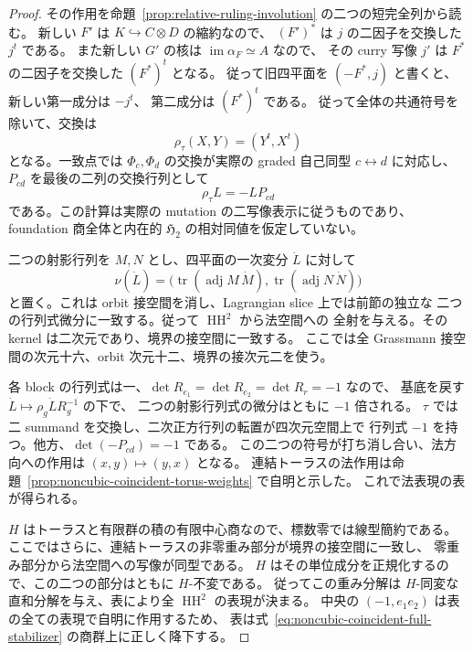 \begin{proof}
その作用を命題~\ref{prop:relative-ruling-involution} の二つの短完全列から読む。
新しい $F'$ は $K\hookrightarrow C\otimes D$ の縮約なので、
$(F')^*$ は $j$ の二因子を交換した $j^t$ である。
また新しい $G'$ の核は $\operatorname{im}\alpha_F\simeq A$ なので、
その curry 写像 $j'$ は $F^*$ の二因子を交換した $(F^*)^t$ となる。
従って旧四平面を $(-F^*,j)$ と書くと、新しい第一成分は $-j^t$、
第二成分は $(F^*)^t$ である。
従って全体の共通符号を除いて、交換は
\[
 \rho_\tau(X,Y)=(Y^t,X^t)
\]
となる。一致点では $\Phi_c,\Phi_d$ の交換が実際の graded 自己同型 $c\leftrightarrow d$
に対応し、$P_{cd}$ を最後の二列の交換行列として
\[
 \rho_\tau L=-LP_{cd}
\]
である。この計算は実際の mutation の二写像表示に従うものであり、
foundation 商全体と内在的 $\mathfrak H_2$ の相対同値を仮定していない。

二つの射影行列を $M,N$ とし、四平面の一次変分 $\dot L$ に対して
\[
 \nu(\dot L)=
 \bigl(\operatorname{tr}(\operatorname{adj}M\,\dot M),
       \operatorname{tr}(\operatorname{adj}N\,\dot N)\bigr)
\]
と置く。これは orbit 接空間を消し、Lagrangian slice 上では前節の独立な
二つの行列式微分に一致する。従って $\operatorname{HH}^2$ から法空間への
全射を与える。その kernel は二次元であり、境界の接空間に一致する。
ここでは全 Grassmann 接空間の次元十六、orbit 次元十二、境界の接次元二を使う。

各 block の行列式は一、$\det R_{e_1}=\det R_{e_2}=\det R_r=-1$ なので、
基底を戻す $\dot L\mapsto\rho_g\dot L R_g^{-1}$ の下で、
二つの射影行列式の微分はともに $-1$ 倍される。
$\tau$ では二 summand を交換し、二次正方行列の転置が四次元空間上で
行列式 $-1$ を持つ。他方、$\det(-P_{cd})=-1$ である。
この二つの符号が打ち消し合い、法方向への作用は $(x,y)\mapsto(y,x)$ となる。
連結トーラスの法作用は命題~\ref{prop:noncubic-coincident-torus-weights} で自明と示した。
これで法表現の表が得られる。

$H$ はトーラスと有限群の積の有限中心商なので、標数零では線型簡約である。
ここではさらに、連結トーラスの非零重み部分が境界の接空間に一致し、
零重み部分から法空間への写像が同型である。
$H$ はその単位成分を正規化するので、この二つの部分はともに $H$-不変である。
従ってこの重み分解は $H$-同変な直和分解を与え、表により全 $\operatorname{HH}^2$ の表現が決まる。
中央の $(-1,e_1e_2)$ は表の全ての表現で自明に作用するため、
表は式~\eqref{eq:noncubic-coincident-full-stabilizer} の商群上に正しく降下する。
\end{proof}

